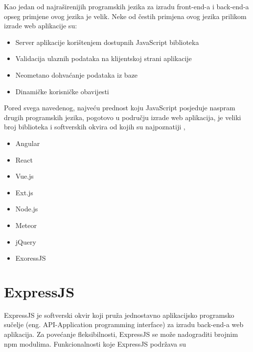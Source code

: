 \documentclass[12pt, oneside, onecolumn]{book}
\begin{document}
{Kao jedan od najraširenijih programskih jezika za izradu front-end-a i back-end-a opseg primjene ovog jezika je velik. Neke od čestih primjena ovog jezika prilikom izrade web aplikacije su:

\begin{itemize}
\item Server aplikacije korištenjem dostupnih JavaScript biblioteka
\item Validacija ulaznih podataka na klijentskoj strani aplikacije
\item Neometano dohvaćanje podataka iz baze
\item Dinamičke korisničke obavijesti
\end{itemize}

Pored svega navedenog, najveću prednost koju JavaScript posjeduje naspram drugih programskih jezika, pogotovo u području izrade web aplikacija, je veliki broj biblioteka i softverskih okvira od kojih su najpoznatiji \cite{js}, \cite{ajs}

\begin{itemize}
\item Angular
\item React
\item Vue.js
\item Ext.js
\item Node.js
\item Meteor
\item jQuery
\item ExoressJS
\end{itemize}

\section{ExpressJS}
ExpressJS je softverski okvir koji pruža jednostavno aplikacijsko programsko sučelje (eng. API-Application programming interface) za izradu back-end-a web aplikacija. Za povećanje fleksibilnosti, ExpressJS se može nadograditi brojnim npm modulima. Funkcionalnosti koje ExpressJS podržava su \cite{expss} 

}
\end{document}
